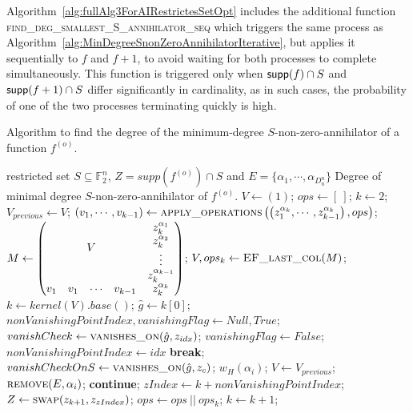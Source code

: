 \documentclass[11pt]{llncs}
\begin{document}
Algorithm~\ref{alg:fullAlg3ForAIRestrictesSetOpt} includes the additional function \textsc{find\_deg\_smallest\_S\_annihilator\_seq} which triggers the same process as Algorithm~\ref{alg:MinDegreeSnonZeroAnnihilatorIterative}, but applies it sequentially to $f$ and $f + 1$, to avoid waiting for both processes to complete simultaneously. This function is triggered only when $\mathsf{supp}(f) \cap S$ and $\mathsf{supp}(f + 1) \cap S$ differ significantly in cardinality, as in such cases, the probability of one of the two processes terminating quickly is high.

\begin{algorithm}
	\caption{Algorithm to find the degree of the minimum-degree $S$-non-zero-annihilator of a function $f^{(o)}$.}\label{alg:MinDegreeSnonZeroAnnihilatorIterative}
	\begin{algorithmic}[1]
		\Require restricted set $S\subseteq \mathbb{F}_2^n$, $Z = supp\left(f^{(o)}\right) \cap S$ and $E = \{\alpha_1, \cdots, \alpha_{D_n^n}\}$
		\Ensure Degree of minimal degree $S$-non-zero-annihilator of $f^{(o)}$.
		\State $V\gets (1)$;
		\State $ops \gets [\ ]$;
		\State $k \gets 2$;
		\State $V_{previous} \gets V$;
		\State $\left(v_1, \cdots, v_{k-1}\right) \gets \mbox{\textsc{apply\_operations}}\left(\left(z_1^{\alpha_k}, \cdots, z_{k-1}^{\alpha_k}\right), ops\right)$\footnotemark;
		\State  $M \gets \begin{pmatrix}
		\multicolumn{4}{c}{\multirow{4}{*}{$V$}} & z_k^{\alpha_1}\\
		& & & & z_k^{\alpha_2}\\
		& & & & \vdots\\
		& & & & z_k^{\alpha_{k-1}}\\
		v_1 & v_1& \cdots & v_{k-1} & z_k^{\alpha_k}
		\end{pmatrix}$;
		\State $V, ops_k\gets \mbox{\textsc{EF\_last\_col}}(M)$\footnotemark;
		\State $k \gets kernel\left(V\right).base()$;
		\State $\hat{g} \gets k[0]$;
		\State $nonVanishingPointIndex, vanishingFlag \gets Null, True$;
		\State $vanishCheck \gets \mbox{\textsc{vanishes\_on}}(\hat{g}, z_{idx})$\footnotemark;
		\State $vanishingFlag \gets False$;
        \State $nonVanishingPointIndex \gets idx$
		\State \textbf{break};
		\EndIf
        \EndFor
		\State $vanishCheckOnS \gets \mbox{\textsc{vanishes\_on}}(\hat{g}, z_c)$;
		\State \Return $w_H\left(\alpha_i\right)$;
		\EndIf
		\EndFor
		\State $V\gets V_{previous}$;
		\State $\mbox{\textsc{remove}}(E, \alpha_i)$;
		\State \textbf{continue}; 
        \Else
		\State $zIndex \gets k+nonVanishingPointIndex$;
		\State $Z \gets \mbox{\textsc{swap}}(z_{k+1}, z_{zIndex})$\footnotemark;
		\EndIf
        \State $ops\gets ops\ ||\ ops_k$;
		\State $k\gets k+1$;
		\EndIf
		\EndWhile
		\State {}
	\end{algorithmic}
\end{algorithm}
\end{document}
